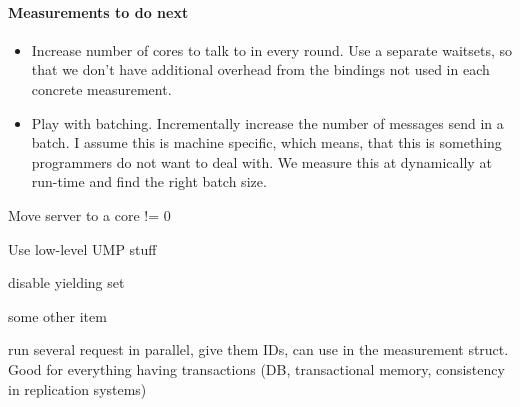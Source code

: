 \documentclass{article}
\begin{document}
\paragraph{Measurements to do next} %
\begin{itemize}
\item Increase number of cores to talk to in every round. Use a
  separate waitsets, so that we don't have additional overhead from
  the bindings not used in each concrete measurement.
\item Play with batching. Incrementally increase the number of
  messages send in a batch. I assume this is machine specific, which
  means, that this is something programmers do not want to deal
  with. We measure this at dynamically at run-time and find the right
  batch size.
\end{itemize}



\begin{itemize}
\item Move server to a core != 0
\item Use low-level UMP stuff
{
\renewcommand{\labelitemi}{\checkmark}
\item disable yielding set 
}
\item some other item
\item run several request in parallel, give them IDs, can use in the
  measurement struct. Good for everything having transactions (DB,
  transactional memory, consistency in replication systems)
\end{itemize}

\newpage



\label{LastPage}
\end{document}

